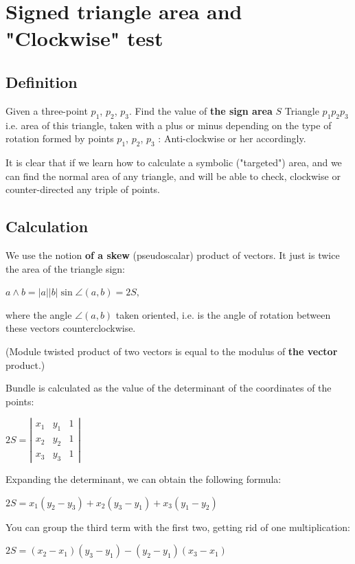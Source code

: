 \section{ Signed triangle area and "Clockwise" test }
\subsection{ Definition }

Given a three-point $p_1$, $p_2$, $p_3$. Find the value of \textbf{the sign area} $S$ Triangle $p_1 p_2 p_3$ i.e. area of ​​this triangle, taken with a plus or minus depending on the type of rotation formed by points $p_1$, $p_2$, $p_3$ : Anti-clockwise or her accordingly.

It is clear that if we learn how to calculate a symbolic ("targeted") area, and we can find the normal area of ​​any triangle, and will be able to check, clockwise or counter-directed any triple of points.

\subsection{ Calculation }

We use the notion \textbf{of a skew} (pseudoscalar) product of vectors. It just is twice the area of ​​the triangle sign:

$a \land b = | a | | b | \sin \angle (a, b) = 2 S,$

where the angle $\angle (a, b)$ taken oriented, i.e. is the angle of rotation between these vectors counterclockwise.

(Module twisted product of two vectors is equal to the modulus of \textbf{the vector} product.)

Bundle is calculated as the value of the determinant of the coordinates of the points:

$2S=\left|\begin{array}{ccc}
x_{1} & y_{1} & 1\\
x_{2} & y_{2} & 1\\
x_{3} & y_{3} & 1
\end{array}\right|$

Expanding the determinant, we can obtain the following formula:

$2S=x_{1}(y_{2}-y_{3})+x_{2}(y_{3}-y_{1})+x_{3}(y_{1}-y_{2})$

You can group the third term with the first two, getting rid of one multiplication:

$2S=(x_{2}-x_{1})(y_{3}-y_{1})-(y_{2}-y_{1})(x_{3}-x_{1})$


